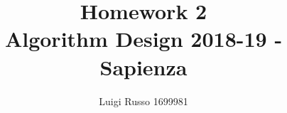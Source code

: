 \documentclass[12pt]{article}
\title{Homework 2\\
	\large Algorithm Design 2018-19 - Sapienza}
\author{Luigi Russo 1699981}
\begin{document}
	
\maketitle

\newpage
\tableofcontents
\newpage



\begin{thebibliography}{10}	
\end{thebibliography}
\end{document}
